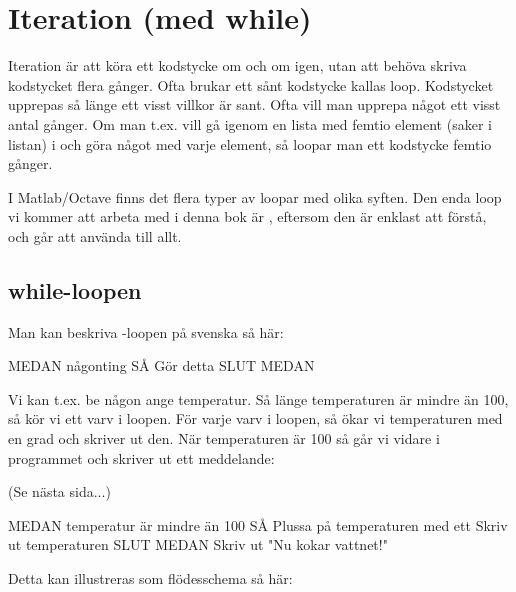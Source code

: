 %
%

\chapter{Iteration (med while)}\label{ch:iteration}
Iteration är att köra ett kodstycke om och om igen, utan att behöva skriva kodstycket flera gånger. Ofta brukar ett sånt kodstycke kallas loop. Kodstycket upprepas så länge ett visst villkor är sant. Ofta vill man upprepa något ett visst antal gånger. Om man t.ex. vill gå igenom en lista med femtio element (saker i listan) i och göra något med varje element, så loopar man ett kodstycke femtio gånger.

I Matlab/Octave finns det flera typer av loopar med olika syften. Den enda loop vi kommer att arbeta med i denna bok är , eftersom den är enklast att förstå, och går att använda till allt.

\section{while-loopen}
Man kan beskriva -loopen på svenska så här:

\begin{pseudo}
MEDAN någonting SÅ
   Gör detta
SLUT MEDAN
\end{pseudo}

Vi kan t.ex. be någon ange temperatur. Så länge temperaturen är mindre än 100, så kör vi ett varv i loopen. För varje varv i loopen, så ökar vi temperaturen med en grad och skriver ut den. När temperaturen är 100 så går vi vidare i programmet och skriver ut ett meddelande:

(Se nästa sida...)
\newpage
\begin{pseudo}
MEDAN temperatur är mindre än 100 SÅ
   Plussa på temperaturen med ett
   Skriv ut temperaturen
SLUT MEDAN
Skriv ut "Nu kokar vattnet!"
\end{pseudo}

Detta kan illustreras som flödesschema så här:

